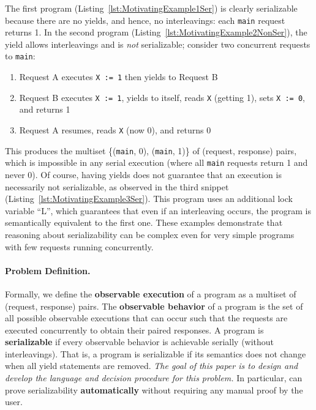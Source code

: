 %
The first program (Listing~\ref{lst:MotivatingExample1Ser}) is clearly serializable because there are no yields, and hence, no interleavings: each \texttt{main} request returns 1.
In the second program (Listing~\ref{lst:MotivatingExample2NonSer}), the yield allows interleavings and is \emph{not} serializable; consider two concurrent requests to \texttt{main}:
\begin{enumerate}
\item Request A executes \texttt{X := 1} then yields to Request B
\item Request B executes \texttt{X := 1}, yields to itself, reads \texttt{X} (getting 1), sets \texttt{X := 0}, and returns 1
\item Request A resumes, reads \texttt{X} (now 0), and returns 0
\end{enumerate}
This produces the multiset \{(\texttt{main}, 0), (\texttt{main}, 1)\} of (request, response) pairs, which is impossible in any serial execution (where all \texttt{main} requests return 1 and never 0).
Of course, having yields does not guarantee that an execution is necessarily not serializable, as observed in the third snippet (Listing~\ref{lst:MotivatingExample3Ser}). This program uses an additional lock variable ``L'', which guarantees that even if an interleaving occurs, the program is semantically equivalent to the first one.
%
These examples demonstrate that reasoning about serializability can be complex even for very simple programs with few requests running concurrently.
\vspace{-.5em}
\paragraph{Problem Definition.}
Formally, we define the \textbf{observable execution} of a \toolname{} program as a multiset of (request, response) pairs. The \textbf{observable behavior} of a \toolname{} program is the set of all possible observable executions that can occur such that the requests are executed concurrently to obtain their paired responses.
A program is \textbf{serializable} if every observable behavior is achievable serially (without interleavings). That is, a \toolname{} program is serializable if its semantics does not change when all yield statements are removed.
%
\emph{The goal of this paper is to design and develop the \toolname{} language and decision procedure for this problem.} In particular, \toolname{} can prove serializability \textbf{automatically} without requiring any manual proof by the user.
\vspace{-.5em}
